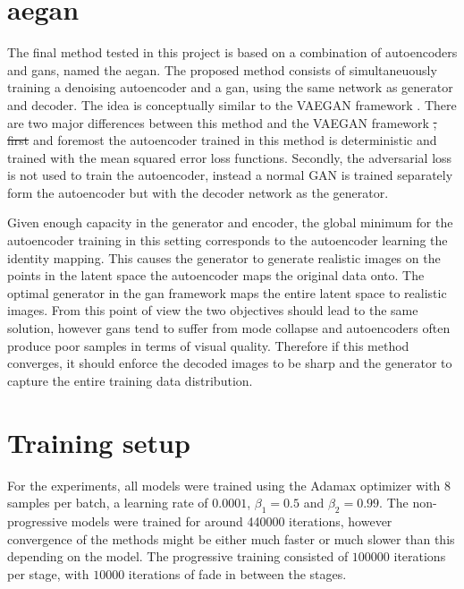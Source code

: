 \section{\acrlong{aegan}}
The final method tested in this project is based on a combination of autoencoders and \acrshort{gans}, named the \acrfull{aegan}. The proposed method consists of simultaneuously training a denoising autoencoder and a \acrshort{gan}, using the same network as generator and decoder. The idea is conceptually similar to the VAEGAN  framework \parencite{LarsenSW15autoencodingbeyond}. There are two major differences between this method and the VAEGAN framework \st{, first}  and foremost the autoencoder trained in this method is deterministic and trained with the mean squared error loss functions. Secondly, the adversarial loss is not used to train the autoencoder, instead a normal GAN is trained separately form the autoencoder but with the decoder network as the generator. 

Given enough capacity in the generator and encoder, the global minimum for the autoencoder training in this setting corresponds to the autoencoder learning the identity mapping. This causes the generator to generate realistic images on the points in the latent space the autoencoder maps the original data onto. The optimal generator in the \acrshort{gan} framework maps the entire latent space to realistic images. From this point of view the two objectives should lead to the same solution, however \acrshort{gans} tend to suffer from mode collapse and autoencoders often produce poor samples in terms of visual quality. Therefore if this method converges, it should enforce the decoded images to be sharp and the generator to capture the entire training data distribution. 

\section{Training setup}
For the experiments, all models were trained using the Adamax optimizer \parencite{kingma2014adam} with $8$ samples per batch, a learning rate of $0.0001$, $\beta_1 = 0.5$ and $\beta_2 = 0.99$. The non-progressive models were trained for around 440000 iterations, however convergence of the methods might be either much faster or much slower than this depending on the model. The progressive training consisted of $100000$ iterations per stage, with $10000$ iterations of fade in between the stages. 

